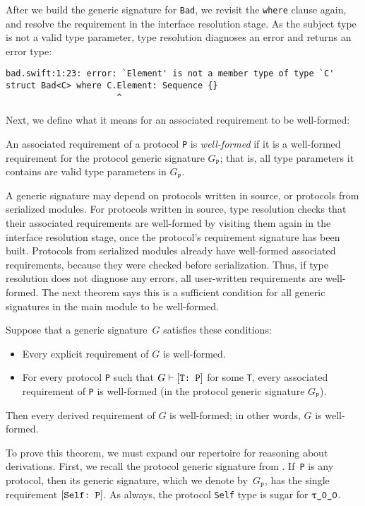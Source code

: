 \documentclass[../generics]{subfiles}
\begin{document}
After we build the generic signature for \texttt{Bad}, we revisit the \texttt{where} clause again, and resolve the requirement in the interface resolution stage. As the subject type is not a valid type parameter, type resolution diagnoses an error and returns an error type:
\begin{Verbatim}
bad.swift:1:23: error: `Element' is not a member type of type `C'
struct Bad<C> where C.Element: Sequence {}
                      ^
\end{Verbatim}

Next, we define what it means for an associated requirement to be well-formed:
\begin{definition}
An associated requirement of a protocol \texttt{P} is \emph{well-formed} if it is a well-formed requirement for the protocol generic signature $G_\texttt{P}$; that is, all type parameters it contains are valid type parameters in $G_\texttt{P}$.
\end{definition}

A generic signature may depend on protocols written in source, or protocols from serialized modules. For protocols written in source, type resolution checks that their associated requirements are well-formed by visiting them again in the interface resolution stage, once the protocol's requirement signature has been built. Protocols from serialized modules already have well-formed associated requirements, because they were checked before serialization. Thus, if type resolution does not diagnose any errors, all user-written requirements are well-formed. The next theorem says this is a sufficient condition for all generic signatures in the main module to be well-formed.

\begin{theorem}\label{valid theorem}
Suppose that a generic signature~$G$ satisfies these conditions:
\begin{itemize}
\item Every explicit requirement of $G$ is well-formed.
\item For every protocol \texttt{P} such that $G\vdash[\texttt{T:~P}]$ for some \texttt{T}, every associated requirement of \texttt{P} is well-formed (in the protocol generic signature $G_\texttt{P}$).
\end{itemize}
Then every derived requirement of $G$ is well-formed; in other words, $G$ is well-formed.
\end{theorem}
To prove this theorem, we must expand our repertoire for reasoning about derivations. First, we recall the protocol generic signature from . If~\texttt{P} is any protocol, then its generic signature, which we denote by~$G_\texttt{P}$, has the single requirement $[\texttt{Self:~P}]$. As always, the protocol \texttt{Self} type is sugar for $\texttt{$\uptau$\_0\_0}$.
\end{document}
